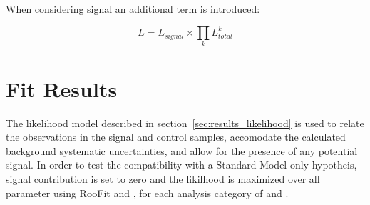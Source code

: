 When considering signal an additional term is introduced:

\begin{equation}
L = L_{signal} \times \prod_k L^k_{total}
\label{eq:total_likelihood_wsignal}
\end{equation}








\section{Fit Results}  %
\label{sec:results_fit}
The likelihood model described in section~\ref{sec:results_likelihood} is used
to relate the observations in the signal and control samples, accomodate the
calculated background systematic uncertainties, and allow for the presence of
any potential signal. In order to test the compatibility with a Standard
Model only hypotheis, signal contribution is set to zero and the likilhood is
maximized over all parameter using RooFit \cite{roofit} and \MINUIT
\cite{James:1975dr}, for each analysis category of \nb and \nj.

